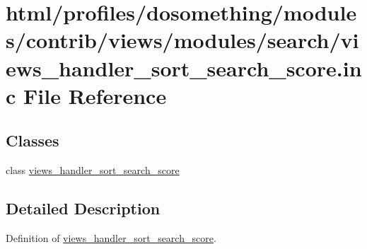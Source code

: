 \hypertarget{views__handler__sort__search__score_8inc}{
\section{html/profiles/dosomething/modules/contrib/views/modules/search/views\_\-handler\_\-sort\_\-search\_\-score.inc File Reference}
\label{views__handler__sort__search__score_8inc}
}
\subsection*{Classes}
\begin{DoxyCompactItemize}
\item 
class \hyperlink{classviews__handler__sort__search__score}{views\_\-handler\_\-sort\_\-search\_\-score}
\end{DoxyCompactItemize}


\subsection{Detailed Description}
Definition of \hyperlink{classviews__handler__sort__search__score}{views\_\-handler\_\-sort\_\-search\_\-score}. 